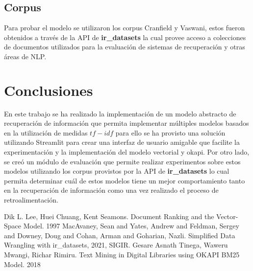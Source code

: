 \documentclass[a4paper,10pt,twocolumn]{article}
\begin{document}
	\subsection{Corpus}\label{sub:figures}
	Para probar el modelo se utilizaron los corpus Cranfield y Vaswani, estos fueron obtenidos a trav\'es de la API de \textbf{ir\_datasets} la cual provee acceso a colecciones de documentos
	utilizados para la evaluaci\'on de sistemas de recuperaci\'on y otras \'areas de NLP.

\section{Conclusiones}\label{sec:conc}

	En este trabajo se ha realizado la implementaci\'on de un modelo abstracto de recuperaci\'on 
	de informaci\'on que permita implementar m\'ultiples modelos basados en la utilizaci\'on de medidas 
	$tf-idf$ para ello se ha provisto una soluci\'on utilizando Streamlit para crear una interfaz de usuario 
	amigable que facilite la experimentación y la implementaci\'on del modelo vectorial y okapi.
	Por otro lado, se creó un módulo de evaluaci\'on que permite realizar experimentos sobre estos modelos utilizando
	los corpus provistos por la API de \textbf{ir\_datasets} lo cual permita determinar cu\'al de estos modelos tiene un mejor comportamiento
	tanto en la recuperación de información como una vez realizado el proceso de retroalimentación.



\begin{thebibliography}{99}
	 Dik L. Lee, Huei Chuang, Kent Seamons. Document Ranking and the Vector-Space Model. 1997
	 MacAvaney, Sean and Yates, Andrew and Feldman, Sergey and Downey, Doug and Cohan, Arman and Goharian, Nazli.
	Simplified Data Wrangling with ir\_datasets, 2021, SIGIR.
	 Gesare Asnath Tinega, Waweru Mwangi, Richar Rimiru. Text Mining in Digital Libraries using OKAPI BM25 Model. 2018




\end{thebibliography}


\label{end}
\end{document}
